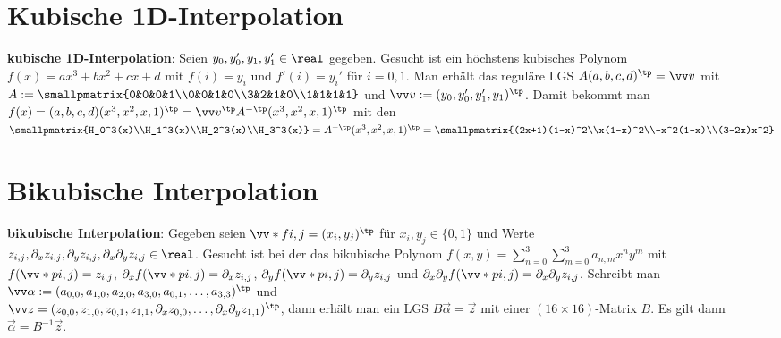 \section{%
    Kubische 1D-Interpolation%
}

\textbf{kubische 1D-Interpolation}:
Seien $y_0, y_0', y_1, y_1' \in \real$ gegeben.
Gesucht ist ein höchstens kubisches Polynom $f(x) = ax^3 + bx^2 + cx + d$
mit $f(i) = y_i$ und $f'(i) = y_i'$ für $i = 0, 1$.
Man erhält das reguläre LGS
$A (a, b, c, d)^\tp = \vec{v}$ mit
$A := \smallpmatrix{0&0&0&1\\0&0&1&0\\3&2&1&0\\1&1&1&1}$ und
$\vec{v} := (y_0, y_0', y_1', y_1)^\tp$.
Damit bekommt man
$f(x) = (a, b, c, d) (x^3, x^2, x, 1)^\tp
= \vec{v}^\tp A^{-\tp} (x^3, x^2, x, 1)^\tp$
mit den\\
$\smallpmatrix{H_0^3(x)\\H_1^3(x)\\H_2^3(x)\\H_3^3(x)}
= A^{-\tp} (x^3, x^2, x, 1)^\tp
= \smallpmatrix{(2x+1)(1-x)^2\\x(1-x)^2\\-x^2(1-x)\\(3-2x)x^2}$

\vspace*{-5mm}

\section{%
    Bikubische Interpolation%
}

\textbf{bikubische Interpolation}:
Gegeben seien $\vecs{f}{i,j} = (x_i, y_j)^\tp$ für $x_i, y_j \in \{0, 1\}$ und Werte\\
$z_{i,j}, \partial_x z_{i,j}, \partial_y z_{i,j},
\partial_x \partial_y z_{i,j} \in \real$.
Gesucht ist bei der  das bikubische Polynom
$f(x, y) = \sum_{n=0}^3 \sum_{m=0}^3 a_{n,m} x^n y^m$ mit
$f(\vecs{p}{i,j}) = z_{i,j}$,
$\partial_x f(\vecs{p}{i,j}) = \partial_x z_{i,j}$,
$\partial_y f(\vecs{p}{i,j}) = \partial_y z_{i,j}$ und
$\partial_x \partial_y f(\vecs{p}{i,j}) = \partial_x \partial_y z_{i,j}$.
Schreibt man $\vec{\alpha} := (a_{0,0}, a_{1,0}, a_{2,0}, a_{3,0}, a_{0,1}, \dotsc, a_{3,3})^\tp$
und\\
$\vec{z} = (z_{0,0}, z_{1,0}, z_{0,1}, z_{1,1}, \partial_x z_{0,0}, \dotsc,
\partial_x \partial_y z_{1,1})^\tp$,
dann erhält man ein LGS $B\vec{\alpha} = \vec{z}$
mit einer $(16 \times 16)$-Matrix $B$.
Es gilt dann $\vec{\alpha} = B^{-1} \vec{z}$.

